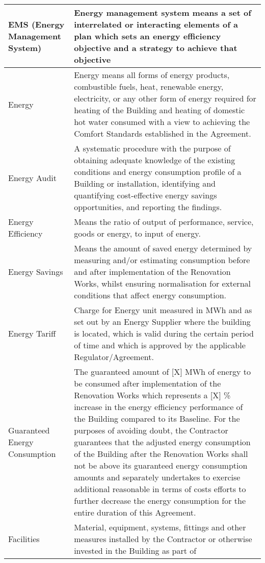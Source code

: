 \begin{center}
\begin{longtabu}{|X|X[3]|}
	EMS (Energy Management System) & Energy management system means a set
					 of interrelated or interacting elements of a plan which sets an energy
					 efficiency objective and a strategy to achieve that objective \\ \hline{}
	Energy & Energy means all forms of energy products, combustible fuels,
		 heat, renewable energy, electricity, or any other form of energy required for
		 heating of the Building and heating of domestic hot water consumed with a view
		 to achieving the Comfort Standards established in the Agreement. \\ \hline{}
	Energy Audit & A systematic procedure with the purpose of obtaining
		       adequate knowledge of the existing conditions and energy consumption profile of
		       a Building or installation, identifying and quantifying cost{-}effective energy
		       savings opportunities, and reporting the findings. \\ \hline{}
	Energy Efficiency & Means the ratio of output of performance, service, goods or energy, to input of energy. \\ \hline{}
	Energy Savings & Means the amount of saved energy determined by
			 measuring and/or estimating consumption before and after implementation of the
			 Renovation Works, whilst ensuring normalisation for external conditions that
			 affect energy consumption. \\ \hline{}
	Energy Tariff & Charge for Energy unit measured in MWh and as set out
			by an Energy Supplier where the building is located, which is valid during the
			certain period of time and which is approved by the applicable
			Regulator/Agreement. \\ \hline{}
	Guaranteed Energy Consumption & The guaranteed amount of [X] MWh of
					energy to be consumed after implementation of the Renovation Works which
					represents a [X] \% increase in the energy efficiency performance of the
					Building compared to its Baseline. For the purposes of avoiding doubt, the
					Contractor guarantees that the adjusted energy consumption of the Building
					after the Renovation Works shall not be above its guaranteed energy consumption
					amounts and separately undertakes to exercise additional reasonable in terms of
					costs efforts to further decrease the energy consumption for the entire
					duration of this Agreement. \\ \hline{}
	Facilities & Material, equipment, systems, fittings and other measures
		     installed by the Contractor or otherwise invested in the Building as part of

\end{longtabu}
\end{center}
